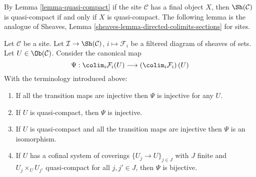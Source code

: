 \noindent
By Lemma \ref{lemma-quasi-compact}
if the site $\mathcal{C}$ has a final object $X$, then
$\Sh(\mathcal{C})$ is quasi-compact if and only if $X$ is quasi-compact.
The following lemma is the analogue of
Sheaves, Lemma \ref{sheaves-lemma-directed-colimits-sections}
for sites.

\begin{lemma}
\label{lemma-directed-colimits-sections}
Let $\mathcal{C}$ be a site. Let
$\mathcal{I} \to \Sh(\mathcal{C})$, $i \mapsto \mathcal{F}_i$
be a filtered diagram of sheaves of sets.
Let $U \in \Ob(\mathcal{C})$.
Consider the canonical map
$$
\Psi :
\colim_i \mathcal{F}_i(U)
\longrightarrow
\left(\colim_i \mathcal{F}_i\right)(U)
$$
With the terminology introduced above:
\begin{enumerate}
\item If all the transition maps are injective then
$\Psi$ is injective for any $U$.
\item If $U$ is quasi-compact, then $\Psi$ is injective.
\item If $U$ is quasi-compact and all the transition maps are injective
then $\Psi$ is an isomorphism.
\item If $U$ has a cofinal system of coverings
$\{U_j \to U\}_{j \in J}$ with
$J$ finite and $U_j \times_U U_{j'}$ quasi-compact
for all $j, j' \in J$, then $\Psi$ is bijective.
\end{enumerate}
\end{lemma}

